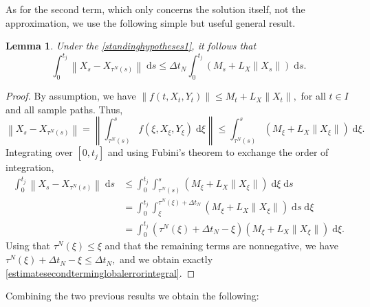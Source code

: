 \documentclass[reqno,12pt]{amsart}
\theoremstyle{plain} %
\newtheorem{lemma}{Lemma}[section]
\theoremstyle{definition} %
\begin{document}
As for the second term, which only concerns the solution itself, not the approximation, we use the following simple but useful general result.

\begin{lemma}
    \label{lemestimatesecondterminglobalerror}
    Under the \cref{standinghypotheses1}, it follows that
    \begin{equation}
        \label{estimatesecondterminglobalerrorintegral}
        \int_0^{t_j}\left\|X_s - X_{\tau^N(s)}\right\| \;\mathrm{d}s \leq \Delta t_N \int_0^{t_j} (M_s + L_X\|X_s\|) \;\mathrm{d}s.
    \end{equation}
\end{lemma}

\begin{proof}
    By assumption, we have $\|f(t, X_t, Y_t)\| \leq M_t + L_X\|X_t\|,$ for all $t\in I$ and all sample paths. Thus,
    \[
      \left\|X_s - X_{\tau^N(s)}\right\| = \left\|\int_{\tau^N(s)}^s f(\xi, X_\xi, Y_\xi)\;\mathrm{d}\xi\right\| \leq \int_{\tau^N(s)}^s (M_\xi + L_X\|X_\xi\|)\;\mathrm{d}\xi.
    \]
    Integrating over $[0, t_j]$ and using Fubini's theorem to exchange the order of integration,
    \begin{align*}
        \int_0^{t_j}\left\|X_s - X_{\tau^N(s)}\right\| \;\mathrm{d}s & \leq \int_0^{t_j}\int_{\tau^N(s)}^s (M_\xi + L_X\|X_\xi\|) \;\mathrm{d}\xi \;\mathrm{d}s \\
        & = \int_0^{t_j}\int_\xi^{\tau^N(\xi) + \Delta t_N} (M_\xi + L_X\|X_\xi\|) \;\mathrm{d}s \;\mathrm{d}\xi \\
        & =  \int_0^{t_j} (\tau^N(\xi) + \Delta t_N - \xi) (M_\xi + L_X\|X_\xi\|) \;\mathrm{d}\xi.
    \end{align*}
    Using that $\tau^N(\xi) \leq \xi$ and that the remaining terms are nonnegative, we have $\tau^N(\xi) + \Delta t_N - \xi \leq \Delta t_N,$ and we obtain exactly \eqref{estimatesecondterminglobalerrorintegral}.
\end{proof}

Combining the two previous results we obtain the following:
\end{document}
